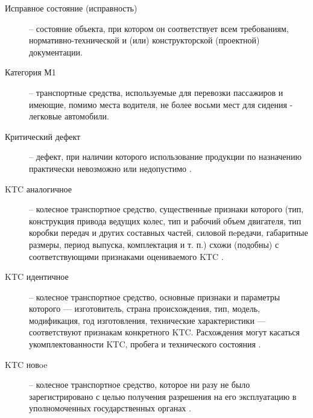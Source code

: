 \begin{description}
	\item
	[Исправное состояние (исправность)] -- состояние объекта, при котором он соответствует всем требованиям, нормативно-технической и (или) конструкторской (проектной) документации.
	\item
	[Категория М1] -- транспортные средства, используемые для перевозки пассажиров и имеющие, помимо места водителя, не более восьми мест для сидения - легковые автомобили.
	\item
	[Критический дефект] -- дефект, при наличии которого использование продукции по назначению 	практически невозможно или недопустимо \autocite{15467:gost}.
	\item
	[KTC аналогичное]  -- колесное транспортное средство, существенные признаки которого (тип, конструкция привода ведущих колес, тип и рабочий объем двигателя, тип коробки передач и других составных частей, силовой пeредачи, габаритные размеры, период выпуска, комплектация и т. п.) схожи (подобны) с соответствующими признаками оцениваемого KTC \cite[часть III, п.1.2]{minust:2018}.
	\item
	[KTC идентичное]  -- колесное транспортное средство, основные признаки и параметры которого — изготовитель, страна происхождения, тип, модель, модификация,  год изготовления,  технические  характеристики —   соответствуют признакам конкретного KTC. Расхождения могут касаться укомплектованности KTC, пробега и технического состояния \cite[часть III, п. 1.2]{minust:2018}.
	\item
	[KTC новoe]  -- колесное транспортное средство, которое ни разу не было зарегистрировано с целью получения разрешения на его эксплуатацию в уполномоченных государственных органах \cite[часть III, п. 1.2]{minust:2018}.

\end{description}
